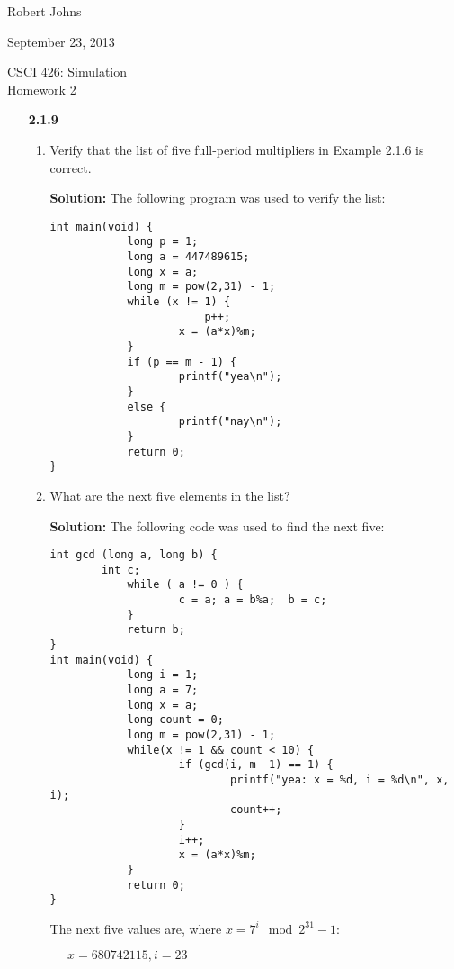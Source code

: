 \documentclass[11pt]{article} %
\newcommand{\tab}{\;\;\;\;\;}
\begin{document}
\hfill Robert Johns

\hfill September 23, 2013

\begin{center} {\Large CSCI 426: Simulation}\\{\large Homework 2}\end{center}

\begin{enumerate}

\item [\bf{2.1.9}]

\begin{enumerate}

\item Verify that the list of five full-period multipliers in Example 2.1.6 is correct.

{\bf Solution:} The following program was used to verify the list:

{\small{\begin{verbatim}
int main(void) {
        	long p = 1;
        	long a = 447489615;
        	long x = a;
        	long m = pow(2,31) - 1;
        	while (x != 1) {
        	        	p++;
                	x = (a*x)%m;
        	}
        	if (p == m - 1) {
                	printf("yea\n");
        	}
        	else {
                	printf("nay\n");
        	}
        	return 0;
}
\end{verbatim}}}

\item What are the next five elements in the list?

{\bf Solution:} The following code was used to find the next five:

{\small{\begin{verbatim}
int gcd (long a, long b) {
        int c;
        	while ( a != 0 ) {
                	c = a; a = b%a;  b = c;
        	}
        	return b;
}
int main(void) {
        	long i = 1;
        	long a = 7;
        	long x = a;
        	long count = 0;
        	long m = pow(2,31) - 1;
        	while(x != 1 && count < 10) {
                	if (gcd(i, m -1) == 1) {
                        	printf("yea: x = %d, i = %d\n", x, i);
                        	count++;
                	}
                	i++;
                	x = (a*x)%m;
        	}
        	return 0;
}
\end{verbatim}}}

The next five values are, where $x = 7^i\mod 2^{31}-1$:

$\tab x = 680742115, i = 23$


\end{enumerate}
\end{enumerate}
\end{document}
